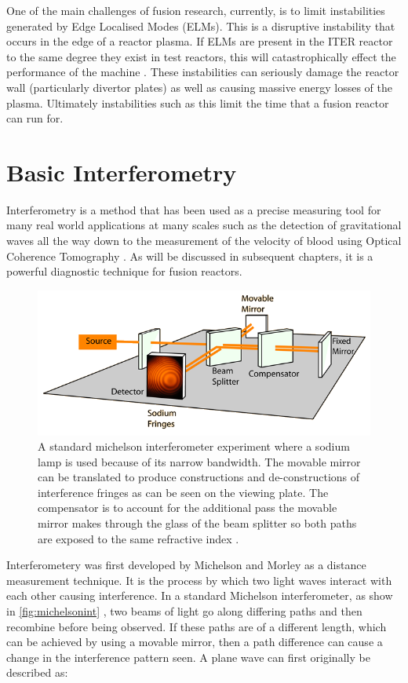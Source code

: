 \documentclass[12pt,a4paper,oneside]{report}
\begin{document}
One of the main challenges of fusion research, currently, is to limit instabilities generated by Edge Localised Modes (ELMs). This is a disruptive instability that occurs in the edge of a reactor plasma. If ELMs are present in the ITER reactor to the same degree they exist in test reactors, this will catastrophically effect the performance of the machine \cite{Loarte2014ProgressOperation}. These instabilities can seriously damage the reactor wall (particularly divertor plates) as well as causing massive energy losses of the plasma. Ultimately instabilities such as this limit the time that a fusion reactor can run for.
	
	\section{Basic Interferometry}
Interferometry is a method that has been used as a precise measuring tool for many real world applications at many scales such as the detection of gravitational waves \cite{AbbottObservationMerger} all the way down to the measurement of the velocity of blood using Optical Coherence Tomography \cite{Zhao2000Phase-resolvedSensitivity}. As will be discussed in subsequent chapters, it is a powerful diagnostic technique for fusion reactors.
\begin{figure}[H]
\includegraphics[width=1\textwidth, center,angle=0]{Images/michelsonint.png}
\caption{A standard michelson interferometer experiment where a sodium lamp is used because of its narrow bandwidth. The movable mirror can be translated to produce constructions and de-constructions of interference fringes as can be seen on the viewing plate. The compensator is to account for the additional pass the movable mirror makes through the glass of the beam splitter so both paths are exposed to the same refractive index \cite{Michelsonimage}.}
\label{fig:michelsonint}
\end{figure}

Interferometery was first developed by Michelson and Morley \cite{Michelson1887RelativeEther} as a distance measurement technique. It is the process by which two light waves interact with each other causing interference. In a standard Michelson interferometer, as show in \autoref{fig:michelsonint} , two beams of light go along differing paths and then recombine before being observed. If these paths are of a different length, which can be achieved by using a movable mirror, then a path difference can cause a change in the interference pattern seen. A plane wave can first originally be described as: 
\end{document}
